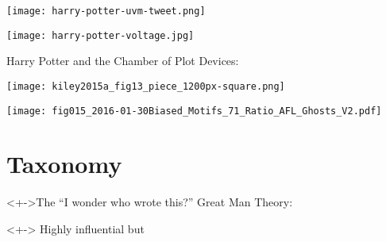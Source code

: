 \begin{frame}


  \begin{center}
    \texttt{[image: harry-potter-uvm-tweet.png]}
  \end{center}

\end{frame}

\begin{frame}[plain]

  \texttt{[image: harry-potter-voltage.jpg]}

\end{frame}

\begin{frame}

  \begin{block}{Harry Potter and the Chamber of Plot Devices:}
  \end{block}

\end{frame}


\begin{frame}

  \begin{center}
    \texttt{[image: kiley2015a\_fig13\_piece\_1200px-square.png]}
  \end{center}
\end{frame}

\begin{frame}

  \begin{center}
    \texttt{[image: fig015\_2016-01-30Biased\_Motifs\_71\_Ratio\_AFL\_Ghosts\_V2.pdf]}
  \end{center}

\end{frame}

\section{Taxonomy}

\begin{frame}

  \begin{block}<+->{The ``I wonder who wrote this?'' Great Man Theory:}
    \bigskip
  \end{block}

  \begin{block}<+->{}
    Highly influential but     
  \end{block}

\end{frame}

